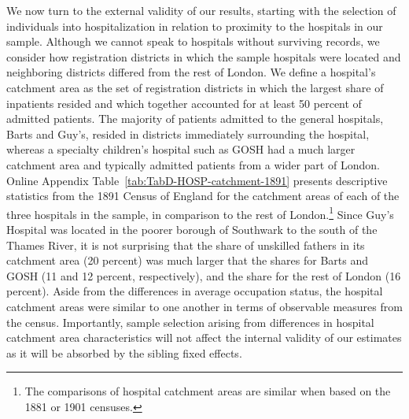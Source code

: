 \documentclass[12pt,english]{article}
\begin{document}
We now turn to the external validity of our results, starting with the selection of individuals into hospitalization in relation to proximity to the hospitals in our sample. Although we cannot speak to hospitals without surviving records, we consider how registration districts in which the sample hospitals were located and neighboring districts differed from the rest of London. We define a hospital's catchment area as the set of registration districts in which the largest share of inpatients resided and which together accounted for at least 50 percent of admitted patients. The majority of patients admitted to the general hospitals, Barts and Guy's, resided in districts immediately surrounding the hospital, whereas a specialty children's hospital such as GOSH had a much larger catchment area and typically admitted patients from a wider part of London. Online Appendix Table~\ref{tab:TabD-HOSP-catchment-1891} presents descriptive statistics from the 1891 Census of England for the catchment areas of each of the three hospitals in the sample, in comparison to the rest of London.\footnote{The comparisons of hospital catchment areas are similar when based on the 1881 or 1901 censuses.}  Since Guy's Hospital was located in the poorer borough of Southwark to the south of the Thames River, it is not surprising that the share of unskilled fathers in its catchment area (20 percent) was much larger that the shares for Barts and GOSH (11 and 12 percent, respectively), and the share for the rest of London (16 percent). Aside from the differences in average occupation status, the hospital catchment areas were similar to one another in terms of observable measures from the census. Importantly, sample selection arising from differences in hospital catchment area characteristics will not affect the internal validity of our estimates as it will be absorbed by the sibling fixed effects. 
\end{document}
